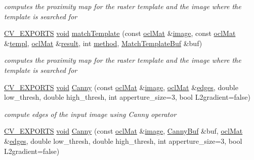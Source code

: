 \begin{DoxyCompactItemize}
\begin{DoxyCompactList}\small\item\em computes the proximity map for the raster template and the image where the template is searched for \end{DoxyCompactList}\item 
\hyperlink{core_2types__c_8h_a1bf9f0e121b54272da02379cfccd0a2b}{C\-V\-\_\-\-E\-X\-P\-O\-R\-T\-S} \hyperlink{legacy_8hpp_a8bb47f092d473522721002c86c13b94e}{void} \hyperlink{namespacecv_1_1ocl_a054ab8431764af79b09116226745ddc8}{match\-Template} (const \hyperlink{classcv_1_1ocl_1_1oclMat}{ocl\-Mat} \&\hyperlink{legacy_8hpp_ad62b16ab219ae2483e8a3d921c44cc97}{image}, const \hyperlink{classcv_1_1ocl_1_1oclMat}{ocl\-Mat} \&\hyperlink{imgproc__c_8h_a3dda0ce9b269462404396ce3e9eedf00}{templ}, \hyperlink{classcv_1_1ocl_1_1oclMat}{ocl\-Mat} \&\hyperlink{legacy_8hpp_a0bb77d54f6769867cfdf389897bd8e43}{result}, int \hyperlink{legacy_8hpp_adc6d8f8df4f2d0df2ece83c432e2681f}{method}, \hyperlink{structcv_1_1ocl_1_1MatchTemplateBuf}{Match\-Template\-Buf} \&buf)
\begin{DoxyCompactList}\small\item\em computes the proximity map for the raster template and the image where the template is searched for \end{DoxyCompactList}\item 
\hyperlink{core_2types__c_8h_a1bf9f0e121b54272da02379cfccd0a2b}{C\-V\-\_\-\-E\-X\-P\-O\-R\-T\-S} \hyperlink{legacy_8hpp_a8bb47f092d473522721002c86c13b94e}{void} \hyperlink{namespacecv_1_1ocl_adc5711369ecabcc42ecd9093688285e7}{Canny} (const \hyperlink{classcv_1_1ocl_1_1oclMat}{ocl\-Mat} \&\hyperlink{legacy_8hpp_ad62b16ab219ae2483e8a3d921c44cc97}{image}, \hyperlink{classcv_1_1ocl_1_1oclMat}{ocl\-Mat} \&\hyperlink{imgproc__c_8h_a0934986249e7ba69309a154af3260f89}{edges}, double low\-\_\-thresh, double high\-\_\-thresh, int apperture\-\_\-size=3, bool L2gradient=false)
\begin{DoxyCompactList}\small\item\em compute edges of the input image using Canny operator \end{DoxyCompactList}\item 
\hyperlink{core_2types__c_8h_a1bf9f0e121b54272da02379cfccd0a2b}{C\-V\-\_\-\-E\-X\-P\-O\-R\-T\-S} \hyperlink{legacy_8hpp_a8bb47f092d473522721002c86c13b94e}{void} \hyperlink{namespacecv_1_1ocl_ac4589c9cfa532ca0bf8bd6b9a012f69a}{Canny} (const \hyperlink{classcv_1_1ocl_1_1oclMat}{ocl\-Mat} \&\hyperlink{legacy_8hpp_ad62b16ab219ae2483e8a3d921c44cc97}{image}, \hyperlink{structcv_1_1ocl_1_1CannyBuf}{Canny\-Buf} \&buf, \hyperlink{classcv_1_1ocl_1_1oclMat}{ocl\-Mat} \&\hyperlink{imgproc__c_8h_a0934986249e7ba69309a154af3260f89}{edges}, double low\-\_\-thresh, double high\-\_\-thresh, int apperture\-\_\-size=3, bool L2gradient=false)

\end{DoxyCompactItemize}
